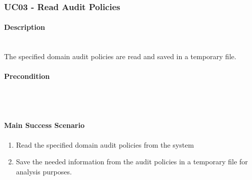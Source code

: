 \subsubsection{UC03 - Read Audit Policies}
\begin{tcolorbox}
    \paragraph{Description} \ \\
    The specified domain audit policies are read and saved in a temporary file.
    \ \\
    \paragraph{Precondition} \ \\
    \ \\
    \paragraph{Main Success Scenario} 
    \begin{enumerate}
        \item Read the specified domain audit policies from the system
        \item Save the needed information from the audit policies in a temporary file for analysis purposes.
    \end{enumerate}   
\end{tcolorbox}

